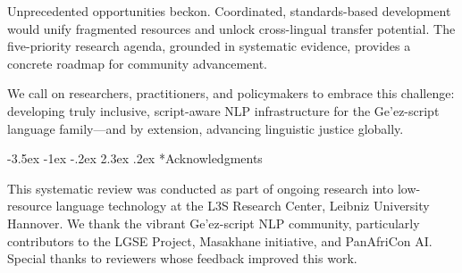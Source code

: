 \documentclass[12pt,a4paper]{article}
\makeatletter
\theoremstyle{plain}
\theoremstyle{definition}
\renewcommand{\section}{\@startsection{section}{1}{\z@}%
  {-3.5ex \@plus -1ex \@minus -.2ex}%
  {2.3ex \@plus.2ex}%
  {\large\bfseries\color{NavyBlue}}}
\makeatother
\begin{document}
Unprecedented opportunities beckon. Coordinated, standards-based development would unify fragmented resources and unlock cross-lingual transfer potential. The five-priority research agenda, grounded in systematic evidence, provides a concrete roadmap for community advancement.

We call on researchers, practitioners, and policymakers to embrace this challenge: developing truly inclusive, script-aware NLP infrastructure for the Ge'ez-script language family---and by extension, advancing linguistic justice globally.


\section*{Acknowledgments}

This systematic review was conducted as part of ongoing research into low-resource language technology at the L3S Research Center, Leibniz University Hannover. We thank the vibrant Ge'ez-script NLP community, particularly contributors to the LGSE Project, Masakhane initiative, and PanAfriCon AI. Special thanks to reviewers whose feedback improved this work.

\end{document}
